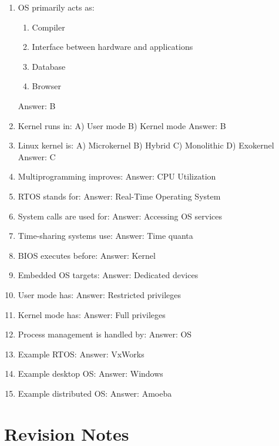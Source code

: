 \begin{enumerate}
\item OS primarily acts as:
\begin{enumerate}
\item Compiler
\item Interface between hardware and applications
\item Database
\item Browser
\end{enumerate}
Answer: B

\item Kernel runs in:
A) User mode
B) Kernel mode
Answer: B

\item Linux kernel is:
A) Microkernel
B) Hybrid
C) Monolithic
D) Exokernel
Answer: C

\item Multiprogramming improves:
Answer: CPU Utilization

\item RTOS stands for:
Answer: Real-Time Operating System

\item System calls are used for:
Answer: Accessing OS services

\item Time-sharing systems use:
Answer: Time quanta

\item BIOS executes before:
Answer: Kernel

\item Embedded OS targets:
Answer: Dedicated devices

\item User mode has:
Answer: Restricted privileges

\item Kernel mode has:
Answer: Full privileges

\item Process management is handled by:
Answer: OS

\item Example RTOS:
Answer: VxWorks

\item Example desktop OS:
Answer: Windows

\item Example distributed OS:
Answer: Amoeba
\end{enumerate}

\section{Revision Notes}

